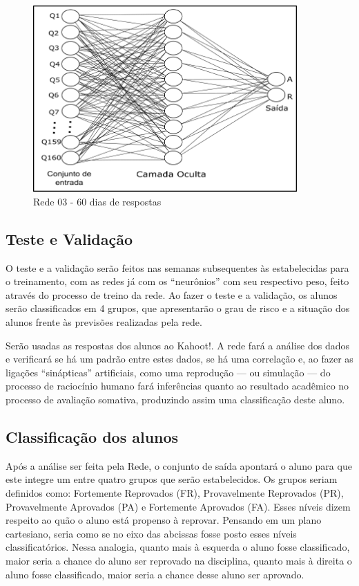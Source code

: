 \begin{figure}
    \centering
    \includegraphics[width=0.9\textwidth]{modelo-monografia-rej-2018/img/rede03_60.png}
    \caption{Rede 03 - 60 dias de respostas}
    \label{fig:rede03}
\end{figure}

\subsection{Teste e Validação}

O teste e a validação serão feitos nas semanas subsequentes às estabelecidas para o treinamento, com as redes já com os ``neurônios'' com seu respectivo peso, feito através do processo de treino da rede. Ao fazer o teste e a validação, os alunos serão classificados em 4 grupos, que apresentarão o grau de risco e a situação dos alunos frente às previsões realizadas pela rede.

Serão usadas as respostas dos alunos ao Kahoot!. A rede fará a análise dos dados e verificará se há um padrão entre estes dados, se há uma correlação e, ao fazer as ligações ``sinápticas'' artificiais, como uma reprodução --- ou simulação --- do processo de raciocínio humano fará inferências quanto ao resultado acadêmico no processo de avaliação somativa, produzindo assim uma classificação deste aluno.

\subsection{Classificação dos alunos}
Após a análise ser feita pela Rede, o conjunto de saída apontará o aluno para que este integre um entre quatro grupos que serão estabelecidos. Os grupos seriam definidos como: Fortemente Reprovados (FR), Provavelmente Reprovados (PR), Provavelmente Aprovados (PA) e Fortemente Aprovados (FA). Esses níveis dizem respeito ao quão o aluno está propenso à reprovar. Pensando em um plano cartesiano, seria como se no eixo das abcissas fosse posto esses níveis classificatórios. Nessa analogia, quanto mais à esquerda o aluno fosse classificado, maior seria a chance do aluno ser reprovado na disciplina, quanto mais à direita o aluno fosse classificado, maior seria a chance desse aluno ser aprovado.

